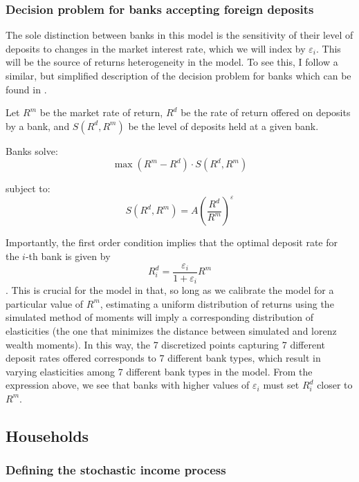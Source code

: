 \subsubsection{Decision problem for banks accepting foreign deposits}

\par The sole distinction between banks in this model is the sensitivity of their level of deposits to changes in the market interest rate, which we will index by $\varepsilon_i$. This will be the source of returns heterogeneity in the model. To see this, I follow a similar, but simplified description of the decision problem for banks which can be found in \cite{PaulUlate2024}.

 \par Let $R^m$ be the market rate of return, $R^d$ be the rate of return offered on deposits by a  bank, and $S(R^d, R^m)$ be the level of deposits held at a given bank.

\par Banks solve:
\[
\max (R^m - R^d) \cdot S(R^d, R^m)
\]

\par subject to:
\[
S(R^d, R^m) = A \left( \frac{R^d}{R^m} \right)^{\varepsilon}
\]

\par Importantly, the first order condition implies that the optimal deposit rate for the $i$-th bank is given by $$ R_i^d = \frac{\varepsilon_i}{1+\varepsilon_i} R^m  $$. This is crucial for the model in that, so long as we calibrate the model for a particular value of $R^m$, estimating a uniform distribution of returns using the simulated method of moments will imply a corresponding distribution of elasticities (the one that minimizes the distance between simulated and lorenz wealth moments). In this way, the 7 discretized points capturing 7 different deposit rates offered corresponds to 7 different bank types, which result in varying elasticities among 7 different bank types in the model. From the expression above, we see that banks with higher values of $\varepsilon_i$  must set $R_i^d$ closer to $R^m$.

\subsection{Households}

\subsubsection{Defining the stochastic income process}

